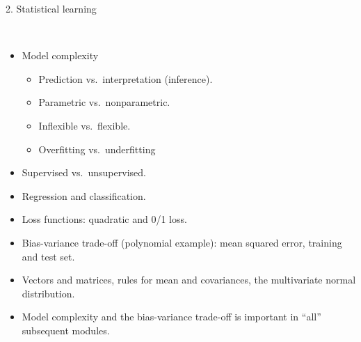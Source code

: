 \documentclass[10pt,ignorenonframetext,]{beamer}
\providecommand{\tightlist}{%
  \setlength{\itemsep}{0pt}\setlength{\parskip}{0pt}}
\begin{document}
\begin{frame}

\begin{block}{2. Statistical learning}

\(~\)

\begin{itemize}
\tightlist
\item
  Model complexity

  \begin{itemize}
  \tightlist
  \item
    Prediction vs.~interpretation (inference).\\
  \item
    Parametric vs.~nonparametric.
  \item
    Inflexible vs.~flexible.
  \item
    Overfitting vs.~underfitting \vspace{2mm}
  \end{itemize}
\item
  Supervised vs.~unsupervised. \vspace{2mm}
\item
  Regression and classification. \vspace{2mm}
\item
  Loss functions: quadratic and 0/1 loss. \vspace{2mm}
\item
  Bias-variance trade-off (polynomial example): mean squared error,
  training and test set. \vspace{2mm}
\item
  Vectors and matrices, rules for mean and covariances, the multivariate
  normal distribution. \vspace{2mm}
\item
  Model complexity and the bias-variance trade-off is important in
  ``all'' subsequent modules.
\end{itemize}

\end{block}

\end{frame}
\end{document}
